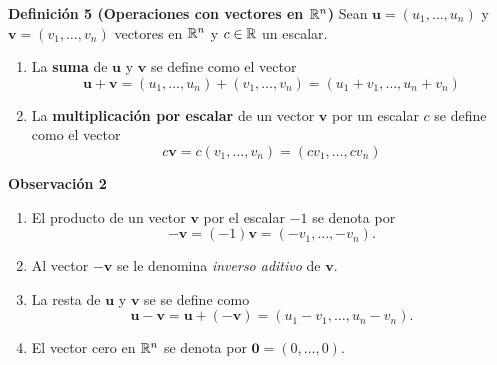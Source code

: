 {\nologo
\begin{frame}%

\vspace{-2mm}
\begin{block}{\textbf{Definición 5 (Operaciones con vectores en $\mathbb{R}^n$)}}
	\justifying
	Sean $\mathbf{u}=(u_1,\hdots,u_n)$ y $\mathbf{v}=(v_1,\hdots,v_n)$ vectores en $\mathbb{R}^n$ y $c\in\mathbb{R}$ un escalar.
	\begin{enumerate}
		\item La \textbf{suma} de $\mathbf{u}$ y $\mathbf{v}$ se define como el vector
		\[
		\mathbf{u+v} = (u_1,\hdots,u_n) + (v_1,\hdots,v_n) = (u_1+v_1,\hdots,u_n+v_n)
		\]
		\item La \textbf{multiplicación por escalar} de un vector $\mathbf{v}$ por un escalar $c$ se define como el vector
		\[
		c\mathbf{v} = c(v_1,\hdots,v_n) = (cv_1,\hdots,cv_n)
		\]	
	\end{enumerate}
\end{block}

\vspace{-2mm}
\begin{alertblock}{\textbf{Observación 2}}
	\begin{enumerate}
		\item[\labelname{$a$}] El producto de un vector $\mathbf{v}$ por el escalar $-1$ se denota por
		\[
		-\mathbf{v} = (-1)\mathbf{v} = (-v_1,\hdots,-v_n).
		\]
		\item[\labelname{$b$}] Al vector $-\mathbf{v}$ se le denomina \textit{inverso aditivo} de $\mathbf{v}$.
		\item[\labelname{$c$}] La resta de $\mathbf{u}$ y $\mathbf{v}$ se se define como 
			\[
				\mathbf{u}-\mathbf{v} = \mathbf{u} + (-\mathbf{v}) =  (u_1-v_1,\hdots,u_n-v_n).
			\]
		\item[\labelname{$b$}] El vector cero en $\mathbb{R}^n$ se denota por  $\mathbf{0} = (0,\hdots,0)$.
	\end{enumerate}
\end{alertblock}

\vspace{0mm}

\end{frame}
}


\subsection{}

